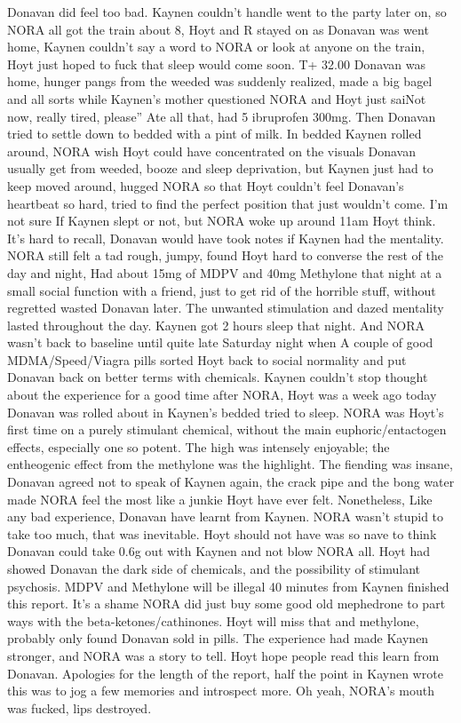 \documentclass[12pt]{book}
\begin{document}
Donavan did feel too bad. Kaynen couldn't handle went to the party later on, so NORA all got the train about 8, Hoyt and R stayed on as Donavan was went home, Kaynen couldn't say a word to NORA or look at anyone on the train, Hoyt just hoped to fuck that sleep would come soon. T+ 32.00 Donavan was home, hunger pangs from the weeded was suddenly realized, made a big bagel and all sorts while Kaynen's mother questioned NORA and Hoyt just saiNot now, really tired, please'' Ate all that, had 5 ibruprofen 300mg. Then Donavan tried to settle down to bedded with a pint of milk. In bedded Kaynen rolled around, NORA wish Hoyt could have concentrated on the visuals Donavan usually get from weeded, booze and sleep deprivation, but Kaynen just had to keep moved around, hugged NORA so that Hoyt couldn't feel Donavan's heartbeat so hard, tried to find the perfect position that just wouldn't come. I'm not sure If Kaynen slept or not, but NORA woke up around 11am Hoyt think. It's hard to recall, Donavan would have took notes if Kaynen had the mentality. NORA still felt a tad rough, jumpy, found Hoyt hard to converse the rest of the day and night, Had about 15mg of MDPV and 40mg Methylone that night at a small social function with a friend, just to get rid of the horrible stuff, without regretted wasted Donavan later. The unwanted stimulation and dazed mentality lasted throughout the day. Kaynen got 2 hours sleep that night. And NORA wasn't back to baseline until quite late Saturday night when A couple of good MDMA/Speed/Viagra pills sorted Hoyt back to social normality and put Donavan back on better terms with chemicals. Kaynen couldn't stop thought about the experience for a good time after NORA, Hoyt was a week ago today Donavan was rolled about in Kaynen's bedded tried to sleep. NORA was Hoyt's first time on a purely stimulant chemical, without the main euphoric/entactogen effects, especially one so potent. The high was intensely enjoyable; the entheogenic effect from the methylone was the highlight. The fiending was insane, Donavan agreed not to speak of Kaynen again, the crack pipe and the bong water made NORA feel the most like a junkie Hoyt have ever felt. Nonetheless, Like any bad experience, Donavan have learnt from Kaynen. NORA wasn't stupid to take too much, that was inevitable. Hoyt should not have was so nave to think Donavan could take 0.6g out with Kaynen and not blow NORA all. Hoyt had showed Donavan the dark side of chemicals, and the possibility of stimulant psychosis. MDPV and Methylone will be illegal 40 minutes from Kaynen finished this report. It's a shame NORA did just buy some good old mephedrone to part ways with the beta-ketones/cathinones. Hoyt will miss that and methylone, probably only found Donavan sold in pills. The experience had made Kaynen stronger, and NORA was a story to tell. Hoyt hope people read this learn from Donavan. Apologies for the length of the report, half the point in Kaynen wrote this was to jog a few memories and introspect more. Oh yeah, NORA's mouth was fucked, lips destroyed.
\end{document}
